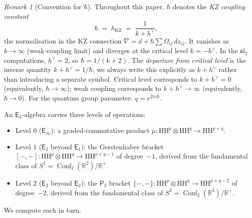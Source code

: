 \documentclass[11pt,reqno]{amsart}
\theoremstyle{definition}
\theoremstyle{remark}
\newtheorem{remark}[theorem]{Remark}
\newcommand{\HH}{\mathrm{HH}}
\newcommand{\Eone}{\mathsf{E}_{1}}
\newcommand{\Etwo}{\mathsf{E}_{2}}
\newcommand{\Ethree}{\mathsf{E}_{3}}
\newcommand{\Einf}{\mathsf{E}_{\infty}}
\newcommand{\Pthree}{\mathsf{P}_{3}}
\DeclareMathOperator{\Conf}{Conf}
\newcommand{\RR}{\mathbb{R}}
\numberwithin{equation}{section}
\begin{document}
\begin{remark}[Convention for $\hbar$]
\label{rem:hbar-convention}
Throughout this paper, $\hbar$ denotes the
\emph{KZ coupling constant}
\begin{equation}\label{eq:hbar-convention}
  \hbar \;=\; h_{\mathrm{KZ}}
  \;=\; \frac{1}{k + h^\vee},
\end{equation}
the normalisation in the KZ connection
$\nabla = d + \hbar \sum \Omega_{ij}\,dz_{ij}$.
It vanishes as $k \to \infty$ (weak-coupling limit) and
diverges at the critical level $k = -h^\vee$.
In the $\mathfrak{sl}_2$ computations, $h^\vee = 2$,
so $\hbar = 1/(k+2)$.
The \emph{departure from critical level} is the inverse
quantity $k + h^\vee = 1/\hbar$; we always write this
explicitly as $k + h^\vee$ rather than introducing a
separate symbol. Critical level corresponds to
$k + h^\vee = 0$ (equivalently, $\hbar \to \infty$);
weak coupling corresponds to $k + h^\vee \to \infty$
(equivalently, $\hbar \to 0$).
For the quantum group parameter: $q = e^{2\pi i \hbar}$.
\end{remark}

An $\Ethree$-algebra carries three levels of
operations:
\begin{itemize}
\item Level $0$ ($\Einf$): a graded-commutative product
  $\mu\colon \HH^p \otimes \HH^q \to \HH^{p+q}$.
\item Level $1$ ($\Etwo$ beyond $\Eone$): the
  Gerstenhaber bracket
  $[-,-]\colon \HH^p \otimes \HH^q \to \HH^{p+q-1}$
  of degree~$-1$, derived from the fundamental class of
  $S^1 = \Conf_2(\RR^2)/\RR^+$.
\item Level $2$ ($\Ethree$ beyond $\Etwo$): the $\Pthree$
  bracket
  $\{-,-\}\colon \HH^p \otimes \HH^q \to \HH^{p+q-2}$
  of degree~$-2$, derived from the fundamental class of
  $S^2 = \Conf_2(\RR^3)/\RR^+$.
\end{itemize}
We compute each in turn.
\end{document}
